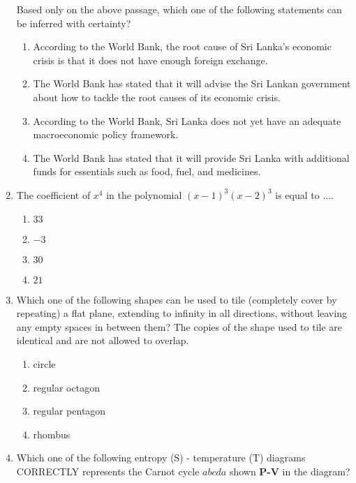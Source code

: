 \documentclass[article]{IEEEtran}
\numberwithin{figure}{enumi}
\begin{document}
\begin{enumerate}
Based only on the above passage, which one of the following statements can be
inferred with certainty?
\begin{enumerate}
    \item According to the World Bank, the root cause of Sri Lanka's economic crisis is that
it does not have enough foreign exchange.
  \item The World Bank has stated that it will advise the Sri Lankan government about how
to tackle the root causes of its economic crisis.
  \item According to the World Bank, Sri Lanka does not yet have an adequate
macroeconomic policy framework.
  \item The World Bank has stated that it will provide Sri Lanka with additional funds for
essentials such as food, fuel, and medicines.
\end{enumerate}
\item The coefficient of $x^4$ in the polynomial $(x-1)^3$$(x-2)^3$ is equal to $\dots$.
\begin{enumerate}
    \item $33$
    \item $-3$
    \item $30$
    \item $21$
\end{enumerate}
\item Which one of the following shapes can be used to tile (completely cover by
repeating) a flat plane, extending to infinity in all directions, without leaving any
empty spaces in between them? The copies of the shape used to tile are identical
and are not allowed to overlap.
\begin{enumerate}
    \item circle
    \item regular octagon
    \item regular pentagon
    \item rhombus
\end{enumerate}
\item Which one of the following entropy (S) - temperature (T) diagrams CORRECTLY
represents the Carnot cycle $abcda$ shown \textbf{P-V} in the diagram?


\begin{figure}[!ht]
\centering
{}
\end{figure}
\end{enumerate}
\end{document}
